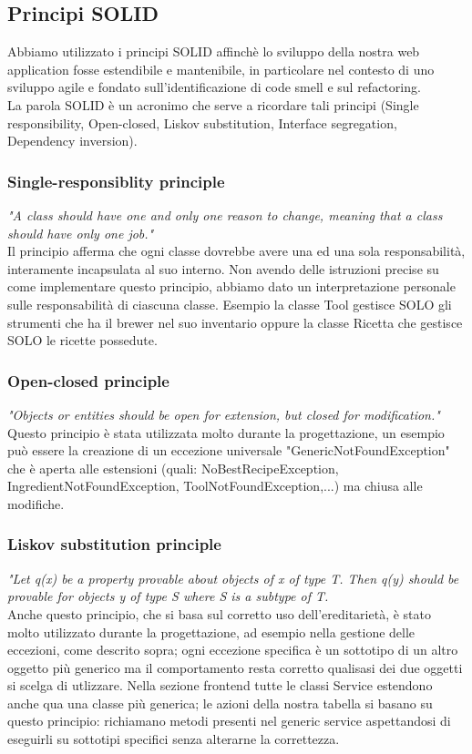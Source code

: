 \documentclass{article}
\begin{document}
\subsection{Principi SOLID}
Abbiamo utilizzato i principi SOLID affinchè lo sviluppo della nostra web application fosse estendibile e mantenibile, in particolare nel contesto di  uno sviluppo agile e fondato sull’identificazione di code smell e sul refactoring.\\
La parola SOLID è un acronimo che serve a ricordare tali principi (Single responsibility, Open-closed, Liskov substitution, Interface segregation, Dependency inversion).
\subsubsection{Single-responsiblity principle}
\textit{"A class should have one and only one reason to change, meaning that a class should have only one job."} \\
Il principio afferma che ogni classe dovrebbe avere una ed una sola responsabilità, interamente incapsulata al suo interno. Non avendo delle istruzioni precise su come implementare questo principio, abbiamo dato un interpretazione personale sulle responsabilità di ciascuna classe. Esempio la classe Tool gestisce SOLO gli strumenti che ha il brewer nel suo inventario oppure la classe Ricetta che gestisce SOLO le ricette possedute.
\subsubsection{Open-closed principle}
\textit{"Objects or entities should be open for extension, but closed for modification."}
Questo principio è stata utilizzata molto durante la progettazione, un esempio può essere la creazione di un eccezione universale "GenericNotFoundException" che è aperta alle estensioni (quali: NoBestRecipeException, IngredientNotFoundException, ToolNotFoundException,...) ma chiusa alle modifiche.
\subsubsection{Liskov substitution principle}
\textit{"Let q(x) be a property provable about objects of x of type T. Then q(y) should be provable for objects y of type S where S is a subtype of T.}\\
Anche questo principio, che si basa sul corretto uso dell’ereditarietà, è stato molto utilizzato durante la progettazione, ad esempio nella gestione delle eccezioni, come descrito sopra; ogni eccezione specifica è un sottotipo di un altro oggetto più generico ma il comportamento resta corretto qualisasi dei due oggetti si scelga di utlizzare. Nella sezione frontend tutte le classi Service estendono anche qua una classe più generica; le azioni della nostra tabella si basano su questo principio: richiamano metodi presenti nel generic service aspettandosi di eseguirli su sottotipi specifici senza alterarne la correttezza.
\end{document}
